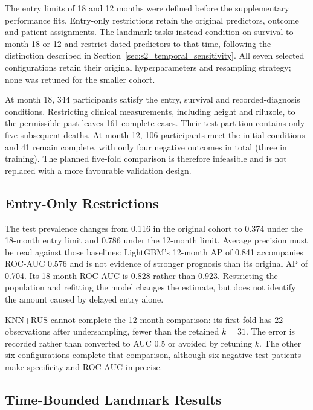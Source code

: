 The entry limits of 18 and 12 months were defined before the supplementary performance fits. Entry-only restrictions retain the original predictors, outcome and patient assignments. The landmark tasks instead condition on survival to month 18 or 12 and restrict dated predictors to that time, following the distinction described in Section~\ref{sec:s2_temporal_sensitivity}. All seven selected configurations retain their original hyperparameters and resampling strategy; none was retuned for the smaller cohort.



At month 18, 344 participants satisfy the entry, survival and recorded-diagnosis conditions. Restricting clinical measurements, including height and riluzole, to the permissible past leaves 161 complete cases. Their test partition contains only five subsequent deaths. At month 12, 106 participants meet the initial conditions and 41 remain complete, with only four negative outcomes in total (three in training). The planned five-fold comparison is therefore infeasible and is not replaced with a more favourable validation design.

\subsection{Entry-Only Restrictions}



The test prevalence changes from 0.116 in the original cohort to 0.374 under the 18-month entry limit and 0.786 under the 12-month limit. Average precision must be read against those baselines: LightGBM's 12-month AP of 0.841 accompanies ROC-AUC 0.576 and is not evidence of stronger prognosis than its original AP of 0.704. Its 18-month ROC-AUC is 0.828 rather than 0.923. Restricting the population and refitting the model changes the estimate, but does not identify the amount caused by delayed entry alone.

KNN+RUS cannot complete the 12-month comparison: its first fold has 22 observations after undersampling, fewer than the retained $k=31$. The error is recorded rather than converted to AUC 0.5 or avoided by retuning $k$. The other six configurations complete that comparison, although six negative test patients make specificity and ROC-AUC imprecise.

\subsection{Time-Bounded Landmark Results}

